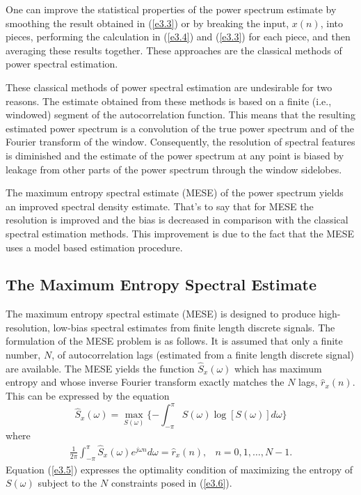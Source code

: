 	One can improve the statistical properties of 
the power spectrum estimate by smoothing the result obtained
in (\ref{e3.3}) or by breaking the input, $x(n)$, into 
pieces, performing the calculation in (\ref{e3.4}) and (\ref{e3.3}) for
each piece, and then averaging these results together.
These approaches are the classical methods of power spectral
estimation.

	These classical methods of power spectral estimation
are undesirable for two reasons.  The estimate obtained from
these methods is based on a finite (i.e., windowed) segment of the
autocorrelation function.  This means that the resulting estimated power 
spectrum is a convolution of the true power spectrum and of the Fourier transform
of the window.  Consequently, the resolution of spectral features is
diminished and the estimate of the power spectrum at any point
is biased by leakage from other parts of the power spectrum through the 
window sidelobes.

	The maximum entropy spectral estimate (MESE)
of the power spectrum yields an improved spectral
density estimate.  That's to say that for MESE
the resolution is improved and the bias
is decreased in comparison with the classical spectral estimation
methods.  This improvement is due to the fact that the MESE
uses a model based estimation procedure.


\subsection{The Maximum Entropy Spectral Estimate}

	The maximum entropy spectral estimate (MESE) is designed
to produce high-resolution, low-bias spectral estimates
from finite length discrete signals.
The formulation of the MESE problem is as follows.
It is assumed that only a finite number, $N$, of autocorrelation
lags (estimated from a finite length discrete signal) are
available.  The MESE yields the function $\hat{S}_x(\omega)$
which has maximum entropy and whose inverse Fourier transform exactly matches the $N$ lags,
$\hat{r}_x(n)$.  This can be expressed by the equation
%
\begin{equation}
     \hat{S}_x(\omega) = \max_{S(\omega)}\{-\int_{-\pi}^{\pi}S(\omega)\log[S(\omega)]d\omega\}
\label{e3.5}
\end{equation}
%
where
%
\begin{equation}
\begin{array}{cc}
{\displaystyle \frac{1}{2\pi}\int_{-\pi}^{\pi}\hat{S}_x(\omega)e^{j\omega n}d\omega = \hat{r}_x(n)}, & \mbox{$n=0,1,\ldots,N-1$}.
\label{e3.6}
\end{array}
\end{equation}
%
Equation (\ref{e3.5}) expresses the optimality condition of maximizing the
entropy of $S(\omega)$ subject to the $N$ constraints posed in (\ref{e3.6}).

